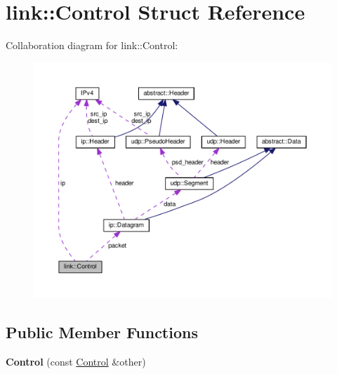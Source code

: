 \hypertarget{structlink_1_1Control}{}\section{link\+:\+:Control Struct Reference}
\label{structlink_1_1Control}


Collaboration diagram for link\+:\+:Control\+:\nopagebreak
\begin{figure}[H]
\begin{center}
\leavevmode
\includegraphics[width=350pt]{structlink_1_1Control__coll__graph}
\end{center}
\end{figure}
\subsection*{Public Member Functions}
\begin{DoxyCompactItemize}
\item 
{\bfseries Control} (const \hyperlink{structlink_1_1Control}{Control} \&other)\hypertarget{structlink_1_1Control_af69072be879940dcb70c80cc40f2e46a}{}\label{structlink_1_1Control_af69072be879940dcb70c80cc40f2e46a}

\end{DoxyCompactItemize}
